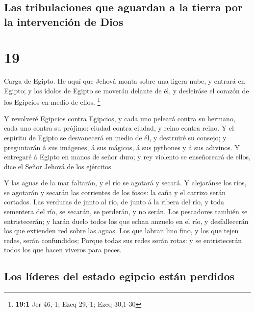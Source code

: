 \hypertarget{las-tribulaciones-que-aguardan-a-la-tierra-por-la-intervenciuxf3n-de-dios}{%
\subsection{Las tribulaciones que aguardan a la tierra por la
intervención de
Dios}\label{las-tribulaciones-que-aguardan-a-la-tierra-por-la-intervenciuxf3n-de-dios}}

\hypertarget{section-18}{%
\section{19}\label{section-18}}

 Carga de Egipto. He aquí que Jehová monta sobre una
ligera nube, y entrará en Egipto; y los ídolos de Egipto se moverán
delante de él, y desleiráse el corazón de los Egipcios en medio de
ellos. \footnote{\textbf{19:1} Jer 46,-1; Ezeq 29,-1; Ezeq 30,1-30}

 Y revolveré Egipcios contra Egipcios, y cada uno peleará
contra su hermano, cada uno contra su prójimo: ciudad contra ciudad, y
reino contra reino.  Y el espíritu de Egipto se
desvanecerá en medio de él, y destruiré su consejo; y preguntarán á sus
imágenes, á sus mágicos, á sus pythones y á sus adivinos. 
Y entregaré á Egipto en manos de señor duro; y rey violento se
enseñoreará de ellos, dice el Señor Jehová de los ejércitos.

 Y las aguas de la mar faltarán, y el río se agotará y
secará.  Y alejaránse los ríos, se agotarán y secarán las
corrientes de los fosos: la caña y el carrizo serán cortados.
 Las verduras de junto al río, de junto á la ribera del
río, y toda sementera del río, se secarán, se perderán, y no serán.
 Los pescadores también se entristecerán; y harán duelo
todos los que echan anzuelo en el río, y desfallecerán los que extienden
red sobre las aguas.  Los que labran lino fino, y los que
tejen redes, serán confundidos;  Porque todas sus redes
serán rotas: y se entristecerán todos los que hacen viveros para peces.

\hypertarget{los-luxedderes-del-estado-egipcio-estuxe1n-perdidos}{%
\subsection{Los líderes del estado egipcio están
perdidos}\label{los-luxedderes-del-estado-egipcio-estuxe1n-perdidos}}

